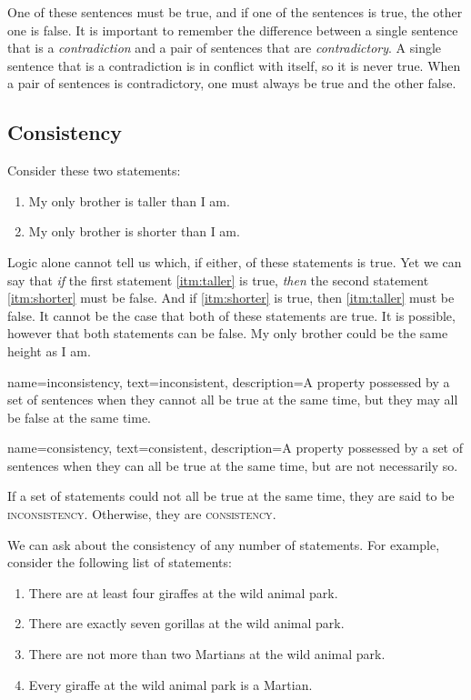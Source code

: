 One of these sentences must be true, and if one of the sentences is true, the other one is false. It is important to remember the difference between a single sentence that is a \emph{contradiction} and a pair of sentences that are \emph{contradictory}. A single sentence that is a contradiction is in conflict with itself, so it is never true. When a pair of sentences is contradictory, one must always be true and the other false.


\subsection{Consistency}
Consider these two statements:

\begin{enumerate}[label=(\alph*)]
\item \label{itm:taller} My only brother is taller than I am.
\item \label{itm:shorter} My only brother is shorter than I am.
\end{enumerate}

Logic alone cannot tell us which, if either, of these statements is true. Yet we can say that \emph{if} the first statement \ref{itm:taller} is true, \emph{then} the second statement \ref{itm:shorter} must be false. And if \ref{itm:shorter}  is true, then \ref{itm:taller} must be false. It cannot be the case that both of these statements are true. It is possible, however that both statements can be false. My only brother could be the same height as I am. 

{
name=inconsistency,
text={inconsistent},
description={A property possessed by a set of sentences when they cannot all be true at the same time, but they may all be false at the same time.}
}

{
name=consistency,
text={consistent},
description={A property possessed by a set of sentences when they can all be true at the same time, but are not necessarily so.}
}

If a set of statements could not all be true at the same time, they are said to be \textsc{\gls{inconsistency}}. \label{def:inconsistency} Otherwise, they are \textsc{\gls{consistency}}. \label{def:consistency} 

We can ask about the consistency of any number of statements. For example, consider the following list of statements:

\label{MartianGiraffes}
\begin{enumerate}[label=(\alph*)]
\item \label{itm:at_least_four}There are at least four giraffes at the wild animal park.
\item \label{itm:exactly_seven} There are exactly seven gorillas at the wild animal park.
\item \label{itm:not_more_than_two} There are not more than two Martians at the wild animal park.
\item \label{itm:martians} Every giraffe at the wild animal park is a Martian.
\end{enumerate}

